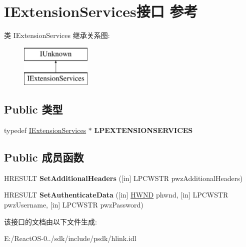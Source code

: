 \hypertarget{interface_i_extension_services}{}\section{I\+Extension\+Services接口 参考}
\label{interface_i_extension_services}
类 I\+Extension\+Services 继承关系图\+:\begin{figure}[H]
\begin{center}
\leavevmode
\includegraphics[height=2.000000cm]{interface_i_extension_services}
\end{center}
\end{figure}
\subsection*{Public 类型}
\begin{DoxyCompactItemize}
\item 
\mbox{\label{interface_i_extension_services_a75b78dec8cb26c00ca92731c22ba48c2}} 
typedef \hyperlink{interface_i_extension_services}{I\+Extension\+Services} $\ast$ {\bfseries L\+P\+E\+X\+T\+E\+N\+S\+I\+O\+N\+S\+E\+R\+V\+I\+C\+ES}
\end{DoxyCompactItemize}
\subsection*{Public 成员函数}
\begin{DoxyCompactItemize}
\item 
\mbox{\label{interface_i_extension_services_a31b03e0ae0342bb957a6d066721607a6}} 
H\+R\+E\+S\+U\+LT {\bfseries Set\+Additional\+Headers} (\mbox{[}in\mbox{]} L\+P\+C\+W\+S\+TR pwz\+Additional\+Headers)
\item 
\mbox{\label{interface_i_extension_services_aa252e240ed6c54289844c54575d830b8}} 
H\+R\+E\+S\+U\+LT {\bfseries Set\+Authenticate\+Data} (\mbox{[}in\mbox{]} \hyperlink{interfacevoid}{H\+W\+ND} phwnd, \mbox{[}in\mbox{]} L\+P\+C\+W\+S\+TR pwz\+Username, \mbox{[}in\mbox{]} L\+P\+C\+W\+S\+TR pwz\+Password)
\end{DoxyCompactItemize}


该接口的文档由以下文件生成\+:\begin{DoxyCompactItemize}
\item 
E\+:/\+React\+O\+S-\/0../sdk/include/psdk/hlink.\+idl\end{DoxyCompactItemize}

